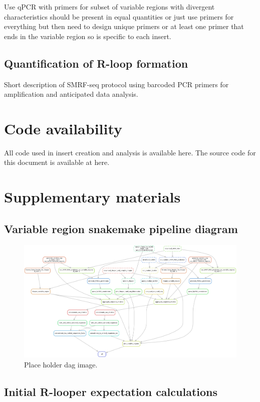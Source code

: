 \documentclass[11pt]{article}
\begin{document}
Use qPCR with primers for subset of variable regions with divergent characteristics should be present in equal quantities or just use primers for everything but then need to design unique primers or at least one primer that ends in the variable region so is specific to each insert. 

\subsection{Quantification of R-loop formation }

Short description of SMRF-seq protocol using barcoded PCR primers for amplification 
and anticipated data analysis. 

\section{Code availability}

All code used in insert creation and analysis is available here. The source code for this document is available at here. 

\section{Supplementary materials}

\subsection{Variable region snakemake pipeline diagram}

\begin{figure}[H]
	\includegraphics[width=15cm]{images/misc/dag.png}
	\centering
	\caption{Place holder dag image.}
\end{figure}

\subsection{Initial R-looper expectation calculations}
\end{document}
